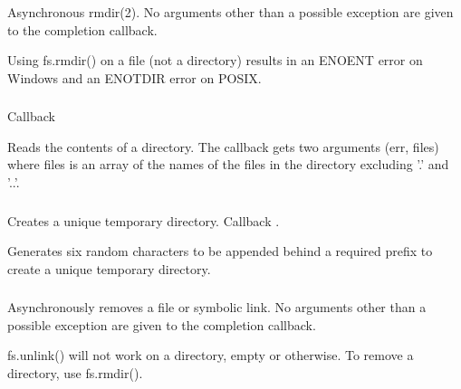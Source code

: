 \subsubsection{}

Asynchronous rmdir(2). No arguments other than a possible exception are given
to the completion callback.

Using fs.rmdir() on a file (not a directory) results in an ENOENT error on
Windows and an ENOTDIR error on POSIX.



\subsubsection{}

Callback 

Reads the contents of a directory. The callback gets two arguments (err,
files) where files is an array of the names of the files in the directory
excluding '.' and '..'.

\subsubsection{}

Creates a unique temporary directory. Callback .

Generates six random characters to be appended behind a required prefix to
create a unique temporary directory.




\subsubsection{}

Asynchronously removes a file or symbolic link. No arguments other than a
possible exception are given to the completion callback.

fs.unlink() will not work on a directory, empty or otherwise. To remove a
directory, use fs.rmdir().




\subsubsection{}


